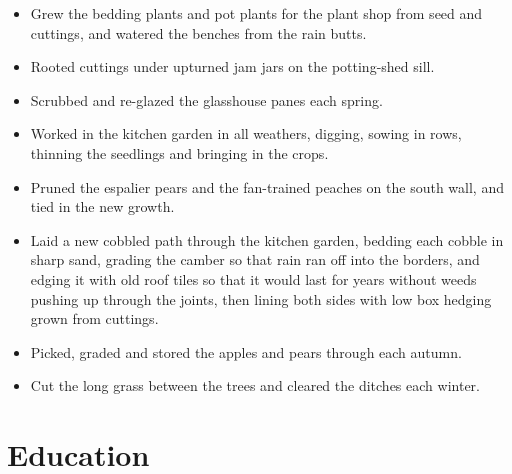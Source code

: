 \documentclass[11pt,a4paper,sans]{moderncv}
\begin{document}
\vspace{3pt}

{\small
\begin{itemize}
    \item Grew the bedding plants and pot plants for the plant shop from seed and cuttings, and watered the benches from the rain butts.
    \item Rooted cuttings under upturned jam jars on the potting-shed sill.
    \item Scrubbed and re-glazed the glasshouse panes each spring.
\end{itemize}\par}
\addvspace{.5em}

\vspace{3pt}

{\small
\begin{itemize}
    \item Worked in the kitchen garden in all weathers, digging, sowing in rows, thinning the seedlings and bringing in the crops.
    \item Pruned the espalier pears and the fan-trained peaches on the south wall, and tied in the new growth.
    \item Laid a new cobbled path through the kitchen garden, bedding each cobble in sharp sand, grading the camber so that rain ran off into the borders, and edging it with old roof tiles so that it would last for years without weeds pushing up through the joints, then lining both sides with low box hedging grown from cuttings.
\end{itemize}\par}
\addvspace{.5em}

\vspace{3pt}

{\small
\begin{itemize}
    \item Picked, graded and stored the apples and pears through each autumn.
    \item Cut the long grass between the trees and cleared the ditches each winter.
\end{itemize}\par}
\addvspace{.5em}

\section{Education}
\vspace{1pt}
\end{document}
